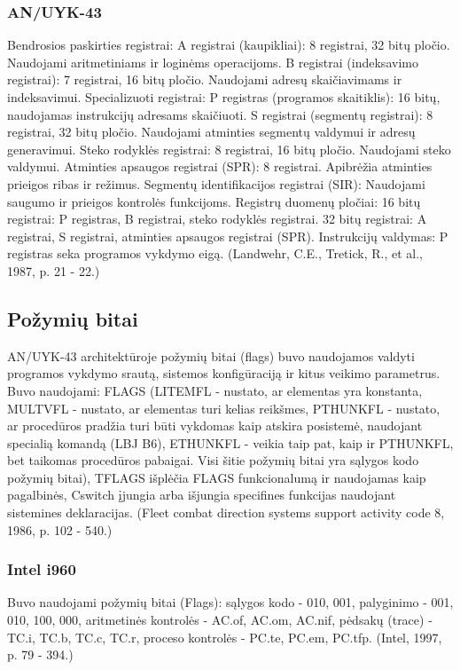 \documentclass{article}
\begin{document}
\subsubsection{AN/UYK-43}
Bendrosios paskirties registrai: A registrai (kaupikliai): 8 registrai, 32 bitų pločio. Naudojami aritmetiniams ir loginėms operacijoms.
B registrai (indeksavimo registrai): 7 registrai, 16 bitų pločio. Naudojami adresų skaičiavimams ir indeksavimui. Specializuoti registrai: P registras (programos skaitiklis): 16 bitų, naudojamas instrukcijų adresams skaičiuoti. S registrai (segmentų registrai): 8 registrai, 32 bitų pločio. Naudojami atminties segmentų valdymui ir adresų generavimui.
Steko rodyklės registrai: 8 registrai, 16 bitų pločio. Naudojami steko valdymui. Atminties apsaugos registrai (SPR): 8 registrai. Apibrėžia atminties prieigos ribas ir režimus. Segmentų identifikacijos registrai (SIR): Naudojami saugumo ir prieigos kontrolės funkcijoms. Registrų duomenų pločiai: 16 bitų registrai: P registras, B registrai, steko rodyklės registrai. 32 bitų registrai: A registrai, S registrai, atminties apsaugos registrai (SPR). Instrukcijų valdymas: P registras seka programos vykdymo eigą. (Landwehr, C.E., Tretick, R., et al., 1987, p. 21 - 22.)
\subsection{Požymių bitai}
AN/UYK-43 architektūroje požymių bitai (flags) buvo naudojamos valdyti programos vykdymo srautą, sistemos konfigūraciją ir kitus veikimo parametrus. Buvo naudojami: FLAGS (LITEMFL - nustato, ar elementas yra konstanta, MULTVFL - nustato, ar elementas turi kelias reikšmes, PTHUNKFL - nustato, ar procedūros pradžia turi būti vykdomas kaip atskira posistemė, naudojant specialią komandą (LBJ B6), ETHUNKFL - veikia taip pat, kaip ir PTHUNKFL, bet taikomas procedūros pabaigai. Visi šitie požymių bitai yra sąlygos kodo požymių bitai), TFLAGS išplėčia FLAGS funkcionalumą ir naudojamas kaip pagalbinės, Cswitch  įjungia arba išjungia specifines funkcijas naudojant sistemines deklaracijas. (Fleet combat direction systems support activity code 8, 1986, p. 102 - 540.)
\subsubsection{Intel i960}
Buvo naudojami požymių bitai (Flags): sąlygos kodo - 010, 001, palyginimo - 001, 010, 100, 000, aritmetinės kontrolės - AC.of, AC.om, AC.nif, pėdsakų (trace) - TC.i, TC.b, TC.c, TC.r, proceso kontrolės - PC.te, PC.em, PC.tfp. (Intel, 1997, p. 79 - 394.)
\end{document}
